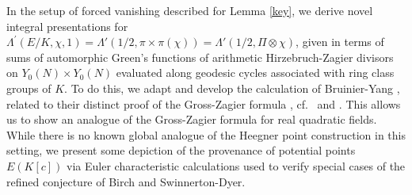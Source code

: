 \documentclass{amsart}
\theoremstyle{definition}
\begin{document}
In the setup of forced vanishing described for Lemma \ref{key}, we derive novel integral presentations for  
$\Lambda^{\prime}(E/K, \chi, 1) = \Lambda'(1/2, \pi \times \pi(\chi)) = \Lambda'(1/2, \Pi \otimes \chi)$, given in terms of sums
of automorphic Green's functions of arithmetic Hirzebruch-Zagier divisors on $Y_0(N) \times Y_0(N)$ evaluated 
along geodesic cycles associated with ring class groups of $K$.
To do this, we adapt and develop the calculation of Bruinier-Yang \cite[Theorem 4.7]{BY}, 
related to their distinct proof of the Gross-Zagier formula \cite[$\S 7$]{BY}, cf.~\cite{GZ} and \cite{YZZ}. 
This allows us to show an analogue of the Gross-Zagier formula for real quadratic fields.
While there is no known global analogue of the Heegner point construction in this setting, 
we present some depiction of the provenance of potential points $E(K[c])$ via 
Euler characteristic calculations used to verify special cases of the refined conjecture of Birch and Swinnerton-Dyer.
\end{document}
